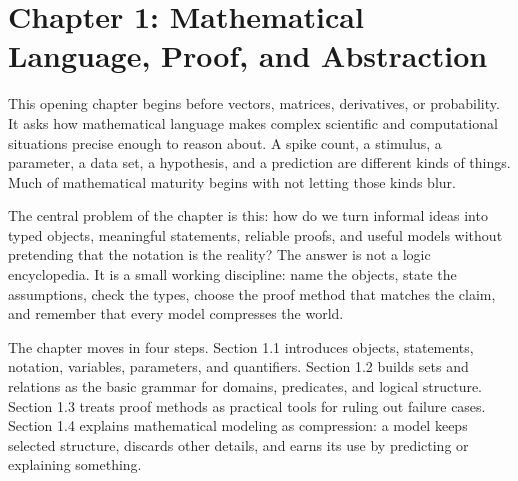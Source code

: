 \section{Chapter 1: Mathematical Language, Proof, and Abstraction}
\label{ch:mathematical-language-proof-abstraction}

This opening chapter begins before vectors, matrices, derivatives, or probability. It asks how mathematical language makes complex scientific and computational situations precise enough to reason about. A spike count, a stimulus, a parameter, a data set, a hypothesis, and a prediction are different kinds of things. Much of mathematical maturity begins with not letting those kinds blur.

The central problem of the chapter is this: how do we turn informal ideas into typed objects, meaningful statements, reliable proofs, and useful models without pretending that the notation is the reality? The answer is not a logic encyclopedia. It is a small working discipline: name the objects, state the assumptions, check the types, choose the proof method that matches the claim, and remember that every model compresses the world.

The chapter moves in four steps. Section 1.1 introduces objects, statements, notation, variables, parameters, and quantifiers. Section 1.2 builds sets and relations as the basic grammar for domains, predicates, and logical structure. Section 1.3 treats proof methods as practical tools for ruling out failure cases. Section 1.4 explains mathematical modeling as compression: a model keeps selected structure, discards other details, and earns its use by predicting or explaining something.

